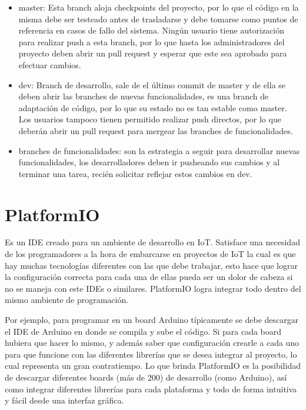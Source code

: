 \begin{itemize}

\item master: Esta branch aloja checkpoints del proyecto, por lo que el código en la misma debe ser testeado antes de trasladarse y debe tomarse como puntos de referencia en casos de fallo del sistema. Ningún usuario tiene autorización para realizar push a esta branch, por lo que hasta los administradores del proyecto deben abrir un pull request y esperar que este sea aprobado para efectuar cambios.

\item dev: Branch de desarrollo, sale de el último commit de master y de ella se deben abrir las branches de nuevas funcionalidades, es una branch de adaptación de código, por lo que su estado no es tan estable como master. Los usuarios tampoco tienen permitido realizar push directos, por lo que deberán abrir un pull request para mergear las branches de funcionalidades.

\item branches de funcionalidades: son la estrategia a seguir para desarrollar nuevas funcionalidades, los desarrolladores deben ir pusheando sus cambios y al terminar una tarea, recién solicitar reflejar estos cambios en dev.

\end{itemize}

\section{PlatformIO}
Es un IDE creado para un ambiente de desarrollo en IoT. Satisface una necesidad de los programadores a la hora de embarcarse en proyectos de IoT la cual es que hay muchas tecnologías diferentes con las que debe trabajar, esto hace que lograr la configuración correcta para cada una de ellas pueda ser un dolor de cabeza si no se maneja con este IDEs o similares. PlatformIO logra  integrar todo dentro del mismo ambiente de programación.~\cite{PlatformIODocs} 

Por ejemplo, para programar en un board Arduino típicamente se debe descargar  el IDE de Arduino en donde se compila y sube el código. Si para cada board hubiera que hacer lo mismo, y además saber que configuración crearle a cada uno para que funcione con las diferentes librerías que se desea integrar al proyecto, lo cual representa un gran contratiempo. Lo que brinda PlatformIO es la posibilidad de descargar diferentes boards (más de 200) de desarrollo (como Arduino), así como integrar diferentes librerías para cada plataforma y todo de forma intuitiva y fácil desde una interfaz gráfica.

